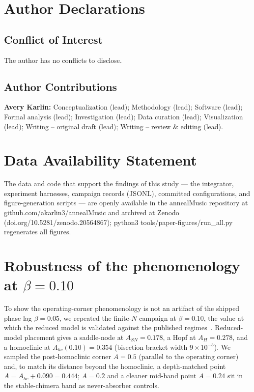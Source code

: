 \documentclass[aip,preprint,amsmath,amssymb]{revtex4-2}
\begin{document}
\section*{Author Declarations}
\subsection*{Conflict of Interest}
The author has no conflicts to disclose.

\subsection*{Author Contributions}
\textbf{Avery Karlin:} Conceptualization (lead); Methodology (lead); Software
(lead); Formal analysis (lead); Investigation (lead); Data curation (lead);
Visualization (lead); Writing -- original draft (lead); Writing -- review \&
editing (lead).

\section*{Data Availability Statement}
The data and code that support the findings of this study --- the integrator,
experiment harnesses, campaign records (JSONL), committed configurations, and
figure-generation scripts --- are openly available in the annealMusic repository at
github.com/akarlin3/annealMusic and archived at Zenodo
(doi.org/10.5281/zenodo.20564867); python3 tools/paper-figures/run\_all.py
regenerates all figures.

\appendix

\section{Robustness of the phenomenology at $\beta = 0.10$}\label{app:beta}

To show the operating-corner phenomenology is not an artifact of the shipped phase
lag $\beta = 0.05$, we repeated the finite-$N$ campaign at $\beta = 0.10$, the value
at which the reduced model is validated against the published
regimes~\cite{abrams2008}. Reduced-model placement gives a saddle-node at
$A_{SN} = 0.178$, a Hopf at $A_H = 0.278$, and a homoclinic at
$A_{hc}(0.10) = 0.354$ (bisection bracket width $9\times10^{-5}$). We sampled the
post-homoclinic corner $A = 0.5$ (parallel to the operating corner) and, to match its
distance beyond the homoclinic, a depth-matched point
$A = A_{hc} + 0.090 = 0.444$; $A = 0.2$ and a cleaner mid-band point $A = 0.24$ sit
in the stable-chimera band as never-absorber controls.
\end{document}
